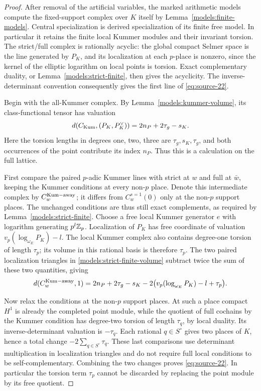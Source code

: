 \begin{proof}
After removal of the artificial variables, the marked arithmetic
models compute the fixed-support complex over $K$ itself by
Lemma~\ref{models:finite-models}.  Central specialization is
derived specialization of its finite free model.  In particular
it retains the finite local Kummer modules and their invariant
torsion.  The strict/full complex is rationally acyclic: the
global compact Selmer space is the line generated by $P_K$,
and its localization at each $p$-place is nonzero, since the
kernel of the elliptic logarithm on local points is torsion.
Exact complementary duality, or
Lemma~\ref{models:strict-finite}, then gives the acyclicity.
The inverse-determinant convention consequently gives the first
line of \eqref{eq:source-22}.

Begin with the all-Kummer complex.  By
Lemma~\ref{models:kummer-volume}, its class-functional tensor has
valuation
\[
 d(C_{\rm Kum},(P_K,P_K^\vee))=2n_P+2\tau_g-s_K.
\]
Here the torsion lengths in degrees one, two, three are
$\tau_g,s_K,\tau_g$, and both occurrences of the point contribute
its index $n_P$.  Thus this is a calculation on the full lattice.

First compare the paired $p$-adic Kummer lines with strict at $w$
and full at $\bar w$, keeping the Kummer conditions at every
non-$p$ place.  Denote this intermediate complex by
$C_w^{\rm Kum-away}$; it differs from $C_w^{s=1}(0)$ only at the
non-$p$ support places.  The unchanged conditions are thus still exact
complements, as required by Lemma~\ref{models:strict-finite}.
Choose a free local Kummer generator $e$
with logarithm generating $p^l\mathbb Z_p$.  Localization of $P_K$ has
free coordinate of valuation
$v_p(\log_{\omega_E}P_K)-l$.  The local Kummer complex also
contains degree-one torsion of length $\tau_p$; its volume in
this rational basis is therefore $\tau_p$.  The two paired
localization triangles in
\eqref{models:strict-finite-volume} subtract twice the sum of
these two quantities, giving
\[
 d(C_w^{\rm Kum-away},1)=2n_P+2\tau_g-s_K
       -2\bigl(v_p(\log_{\omega_E}P_K)-l+\tau_p\bigr).
\]

Now relax the conditions at the non-$p$ support places.  At
such a place compact $H^1$ is already the completed point module,
while the quotient of full cochains by the Kummer condition has
degree-two torsion of length $\tau_q$, by local duality.
Its inverse-determinant valuation is $-\tau_q$.  Each rational
$q\in S^\circ$ gives two places of $K$, hence a total change
$-2\sum_{q\in S^\circ}\tau_q$.  These last comparisons use
determinant multiplication in localization triangles and do not
require full local conditions to be self-complementary.
Combining the two changes proves \eqref{eq:source-22}.
In particular the torsion term $\tau_p$
cannot be discarded by replacing the point module by its free
quotient.


\end{proof}
